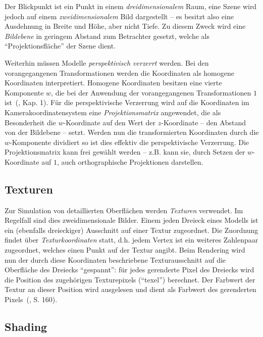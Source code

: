 \documentclass[twoside,a4paper,fleqn,12pt]{book}
\begin{document}
Der Blickpunkt ist ein Punkt in einem \emph{dreidimensionalem} Raum, eine Szene wird jedoch auf einem
\emph{zweidimensionalem} Bild dargestellt -- es besitzt also eine Ausdehnung in Breite
und Höhe, aber nicht Tiefe. Zu diesem Zweck wird eine \emph{Bildebene} in geringem Abstand zum Betrachter gesetzt,
welche als "`Projektionsfläche"' der Szene dient.

Weiterhin müssen Modelle \emph{perspektivisch verzerrt} werden. Bei den vorangegangenen Transformationen werden die Koordinaten
als homogene Koordinaten interpretiert. Homogene Koordinaten besitzen eine vierte Komponente $w$, die bei der Anwendung
der vorangegangenen Transformationen $1$ ist~(\cite{watt_de}, Kap. 1).
Für die perspektivische Verzerrung wird auf die Koordinaten im Kamerakoordinatensystem eine \emph{Projektionsmatrix} angewendet,
die als Besonderheit die $w$-Koordinate auf den Wert der $z$-Koordinate -- den Abstand von der Bildebene -- setzt.
Werden nun die transformierten Koordinaten durch die $w$-Komponente dividiert so ist dies effektiv die perspektivische Verzerrung.
Die Projektionsmatrix kann frei gewählt werden -- z.B. kann sie, durch Setzen der $w$-Koordinate auf $1$, auch orthographische
Projektionen darstellen.

\subsection{Texturen}

Zur Simulation von detaillierten Oberflächen werden \emph{Texturen} verwendet. Im Regelfall sind dies zweidimensionale
Bilder. Einem jeden Dreieck eines Modells ist ein (ebenfalls dreieckiger) Ausschnitt auf einer Textur zugeordnet. 
Die Zuordnung findet über \emph{Texturkoordinaten} statt, d.h. jedem Vertex ist ein weiteres Zahlenpaar zugeordnet,
welches einen Punkt auf der Textur angibt.
Beim Rendering wird nun der durch diese Koordinaten beschriebene Texturausschnitt auf die Oberfläche des Dreiecks 
"`gespannt"': für jedes gerenderte Pixel des Dreiecks wird die Position des zugehörigen Texturepixels (``texel'')
berechnet. Der Farbwert der Textur an dieser Position wird ausgelesen und dient als Farbwert des gerenderten Pixels~(\cite{watt_de}, S. 160).

\subsection{Shading}
\end{document}
